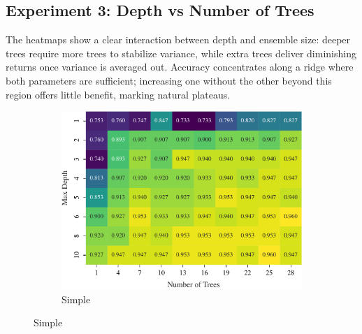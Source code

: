 \documentclass[conference]{IEEEtran}
\begin{document}
\subsection{Experiment 3: Depth vs Number of Trees}
\label{sec:results-exp3}
The heatmaps show a clear interaction between depth and ensemble size: deeper trees require more trees to stabilize variance, while extra trees deliver diminishing returns once variance is averaged out. Accuracy concentrates along a ridge where both parameters are sufficient; increasing one without the other beyond this region offers little benefit, marking natural plateaus.

\begin{figure}[H]
  \centering
  \begin{subfigure}[b]{\columnwidth}
    \includegraphics[width=\linewidth]{images/simple_depth_vs_trees_heatmap.pdf}
    \caption{Simple}
    \label{fig:exp3-simple-heatmap-a}
  \end{subfigure}\hfill


\end{figure}
\end{document}
